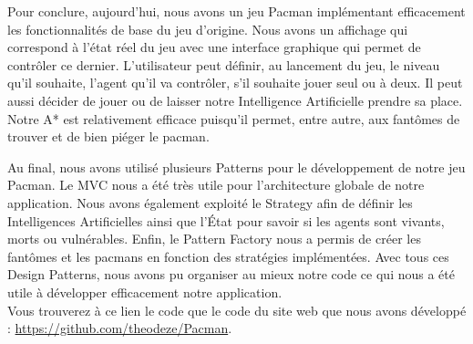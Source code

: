 \documentclass[a4paper, 11pt]{article}
\begin{document}
Pour conclure, aujourd'hui, nous avons un jeu Pacman implémentant efficacement les fonctionnalités de base du jeu d'origine. Nous avons un affichage qui correspond
à l'état réel du jeu avec une interface graphique qui permet de contrôler ce dernier. L'utilisateur peut définir, au lancement du jeu, le niveau qu'il souhaite, 
l'agent qu'il va contrôler, s'il souhaite jouer seul ou à deux. Il peut aussi décider de jouer ou de laisser notre Intelligence Artificielle prendre sa place.
Notre A* est relativement efficace puisqu'il permet, entre autre, aux fantômes de trouver et de bien piéger le pacman.

Au final, nous avons utilisé plusieurs Patterns pour le développement de notre jeu Pacman. Le MVC nous a été très utile pour l'architecture globale
de notre application. Nous avons également exploité le Strategy afin de définir les Intelligences Artificielles ainsi que l'État pour savoir si les agents 
sont vivants, morts ou vulnérables. Enfin, le Pattern Factory nous a permis de créer les fantômes et les pacmans en fonction des stratégies implémentées. 
Avec tous ces Design Patterns, nous avons pu organiser au mieux notre code ce qui nous a été utile à développer efficacement notre application. \\

Vous trouverez à ce lien le code que le code du site web que nous avons développé : \url{https://github.com/theodeze/Pacman}.
\end{document}
